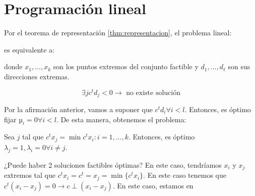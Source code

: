 \section{Programación lineal}

Por el teorema de representación \ref{thm:representacion}, el problema lineal:


\begin{ioprob}
\end{ioprob}

es equivalente a: 

\begin{ioprob}
\end{ioprob}

donde $x_1,\ldots, x_k$ son los puntos extremos del conjunto factible y  $d_1,\ldots,d_\ell$ son sus direcciones extremas.



\[\exists j c^td_j < 0 \to \text{ no existe solución}\]

Por la afirmación anterior, vamos a suponer que $c^td_i ∀i < l$. Entonces, es óptimo fijar $µ_i = 0∀i<l$. De esta manera, obtenemos el problema:
\begin{ioprob}
\end{ioprob}

Sea $j$ tal que $c^tx_j = \min{c^tx_i : i = 1,..., k}$. Entonces, es óptimo $λ_j = 1, λ_i = 0 ∀i≠j$.


\begin{figure}[h]
\centering
{}
\end{figure}


¿Puede haber 2 soluciones factibles óptimas? En este caso, tendríamos $x_i$ y $x_j$ extremos tal que $c^tx_i = c^t = x_j = \min\{c^tx_i \}$. En este caso tenemos que $c^t(x_i - x_j) = 0 \to c\perp (x_i-x_j)$. En este caso, estamos en


